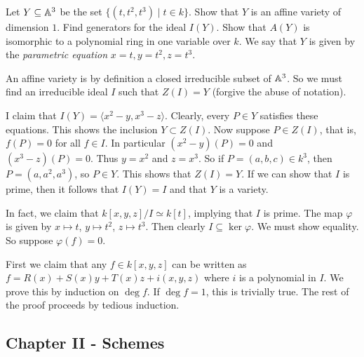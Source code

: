 \documentclass[11pt, english]{article}
\begin{document}
\begin{exc}

Let $Y \subseteq \mathbb{A}^3$ be the set $\{ (t,t^2,t^3) \mid t \in k\}$. Show that $Y$ is an affine variety of dimension $1$. Find generators for the ideal $I(Y)$. Show that $A(Y)$ is isomorphic to a polynomial ring in one variable over $k$. We say that $Y$ is given by the \emph{parametric equation} $x=t,y=t^2,z=t^3$.  
\end{exc}
\begin{sol}
An affine variety is by definition a closed irreducible subset of $\mathbb{A}^3$. So we must find an irreducible ideal $I$ such that $Z(I)=Y$ (forgive the abuse of notation).

I claim that $I(Y)=\langle x^2-y,x^3-z \rangle$. Clearly, every $P \in Y$ satisfies these equations. This shows the inclusion $Y \subset Z(I)$. Now suppose $P \in Z(I)$, that is, $f(P)=0$ for all $f \in I$. In particular $(x^2-y)(P)=0$ and $(x^3-z)(P)=0$. Thus $y=x^2$ and $z=x^3$. So if $P=(a,b,c) \in k^3$, then $P=(a,a^2,a^3)$, so $P \in Y$. This shows that $Z(I)=Y$. If we can show that $I$ is prime, then it follows that $I(Y)=I$ and that $Y$ is a variety.

In fact, we claim that $k[x,y,z]/I \simeq k[t]$, implying that $I$ is prime. The map $\varphi$ is given by $x \mapsto t$, $y \mapsto t^2$, $z \mapsto t^3$. Then clearly $I \subseteq \ker \varphi$. We must show equality. So suppose $\varphi(f)=0$. 

First we claim that any $f \in k[x,y,z]$ can be written as $f=R(x)+S(x)y+T(x)z+i(x,y,z)$ where $i$ is a polynomial in $I$. We prove this by induction on $\deg f$. If $\deg f = 1$, this is trivially true.  The rest of the proof proceeds by tedious induction.
\end{sol}

\subsection{Chapter II - Schemes}
\end{document}
